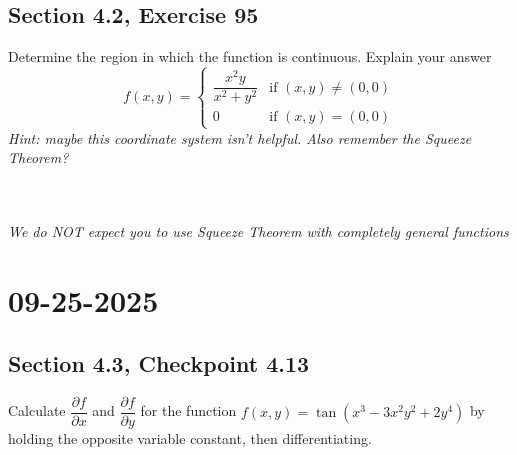 \documentclass[]{mangos-musings}
\begin{document}
\subsection{Section 4.2, Exercise 95}
Determine the region in which the function is continuous. Explain your answer 
\[f(x, y) = \begin{cases}
  \dfrac{x^2y}{x^2 + y^2} & \text{if } (x,y)\neq(0,0)
  \\ 0 & \text{if }(x, y) = (0, 0)
\end{cases}\]
\textit{Hint: maybe this coordinate system isn't helpful. Also remember the Squeeze Theorem?}
\begin{align*}
  \\ \\ \\ \\ \\ \\ \\ \\
\end{align*}
\textit{We do NOT expect you to use Squeeze Theorem with completely general functions}


\newpage
\section{09-25-2025}
\subsection{Section 4.3, Checkpoint 4.13}
Calculate $\dfrac{\partial f}{\partial x}$ and $\dfrac{\partial f}{\partial y}$ for the function $f(x, y) = \tan(x^3 - 3x^2 y^2 + 2y^4)$ by holding the opposite variable constant, then differentiating.
\begin{align*}
  \\ \\ \\
\end{align*}
\end{document}
